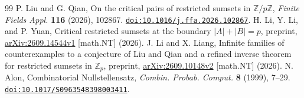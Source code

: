\documentclass[12pt]{article}
\theoremstyle{remark}
\begin{document}
\begin{thebibliography}{99}
P. Liu and G. Qian, On the critical pairs of restricted sumsets in
$\mathbb Z/p\mathbb Z$, \emph{Finite Fields Appl.} \textbf{116} (2026), 102867.
\href{https://doi.org/10.1016/j.ffa.2026.102867}{\nolinkurl{doi:10.1016/j.ffa.2026.102867}}.
H. Li, Y. Li, and P. Yuan, Critical restricted sumsets at the boundary
$|A|+|B|=p$, preprint, \href{https://arxiv.org/abs/2609.14544v1}{arXiv:2609.14544v1} [math.NT] (2026).
J. Li and X. Liang, Infinite families of counterexamples to a conjecture
of Liu and Qian and a refined inverse theorem for restricted sumsets in
$\mathbb Z_p$, preprint, \href{https://arxiv.org/abs/2609.10148v2}{arXiv:2609.10148v2} [math.NT] (2026).
N. Alon, Combinatorial Nullstellensatz,
\emph{Combin. Probab. Comput.} \textbf{8} (1999), 7--29.
\href{https://doi.org/10.1017/S0963548398003411}{\nolinkurl{doi:10.1017/S0963548398003411}}.
\end{thebibliography}
\end{document}
